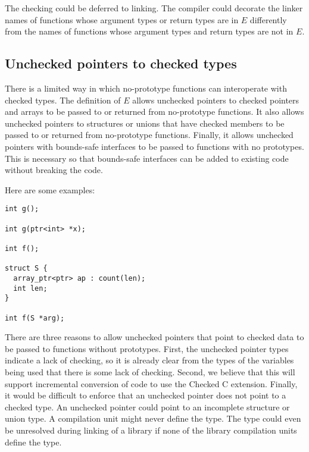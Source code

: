 The checking could be deferred to linking. The compiler could decorate the linker names of
functions whose argument types or return types are in $E$ differently from the names 
of functions whose argument types and return types are not in $E$.

\subsection{Unchecked pointers to checked types}
There is a limited way in which no-prototype functions can interoperate with checked types.
The definition of $E$ allows unchecked
pointers to checked pointers and arrays
to be passed to or returned from no-prototype functions.  It also allows unchecked pointers to
structures or unions that have checked members to be passed to or returned from
no-prototype functions.  Finally, it allows unchecked pointers with bounds-safe interfaces to be
passed to functions with no prototypes.  This is necessary so that bounds-safe interfaces
can be added to existing code without breaking the code.   

Here are some examples:
\begin{lstlisting}
int g();

int g(ptr<int> *x);

int f();

struct S {
  array_ptr<ptr> ap : count(len);
  int len;
}

int f(S *arg);
\end{lstlisting}

There are three reasons to allow unchecked pointers that point to checked data to
be passed to functions without prototypes.  First, the unchecked pointer types 
indicate a lack of checking, so it is already clear from the types of the variables being
used that there is some lack of checking.  Second, we believe that this
will support incremental conversion of code to use the Checked C extension.  Finally,
it would be difficult to enforce that an unchecked pointer does not point
to a checked type. An unchecked pointer could point to an incomplete
structure or union type. A compilation unit might never define the type. The type
could even be unresolved during linking of a library if none of the library compilation units
define the type.
